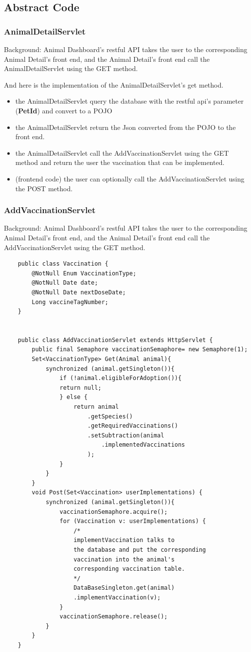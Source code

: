 \documentclass[a4paper]{article}
\begin{document}
\subsection*{Abstract Code}

\subsubsection*{AnimalDetailServlet}

Background: Animal Dashboard's restful API takes the user to the corresponding Animal Detail's front end, and the Animal Detail's front end call the AnimalDetailServlet using the GET method.

And here is the implementation of the AnimalDetailServlet's get method.
\begin{itemize}
	\item the AnimalDetailServlet query the database with the restful api's parameter (\textbf{PetId}) and convert to a POJO
	\item the AnimalDetailServlet return the Json converted from the POJO to the front end.
	\item the AnimalDetailServlet call the AddVaccinationServlet using the GET method and return the user the vaccination that can be implemented.
	\item (frontend code) the user can optionally call the AddVaccinationServlet using the POST method.
\end{itemize}


\subsubsection*{AddVaccinationServlet}

Background: Animal Dashboard's restful API takes the user to the corresponding Animal Detail's front end, and the Animal Detail's front end call the AddVaccinationServlet using the GET method.


\begin{lstlisting}
	public class Vaccination {
		@NotNull Enum VaccinationType;
		@NotNull Date date;
		@NotNull Date nextDoseDate;
		Long vaccineTagNumber;
	}


	public class AddVaccinationServlet extends HttpServlet {
		public final Semaphore vaccinationSemaphore= new Semaphore(1);
		Set<VaccinationType> Get(Animal animal){
			synchronized (animal.getSingleton()){
				if (!animal.eligibleForAdoption()){
				return null;
				} else {
					return animal
						.getSpecies()
						.getRequiredVaccinations()
						.setSubtraction(animal
							.implementedVaccinations
						);
				}
			}
		}
		void Post(Set<Vaccination> userImplementations) {
			synchronized (animal.getSingleton()){
				vaccinationSemaphore.acquire();
				for (Vaccination v: userImplementations) {
					/*
					implementVaccination talks to
					the database and put the corresponding
					vaccination into the animal's
					corresponding vaccination table.
					*/
					DataBaseSingleton.get(animal)
					.implementVaccination(v);
				}
				vaccinationSemaphore.release();
			}
		}
	}
\end{lstlisting}
\end{document}
